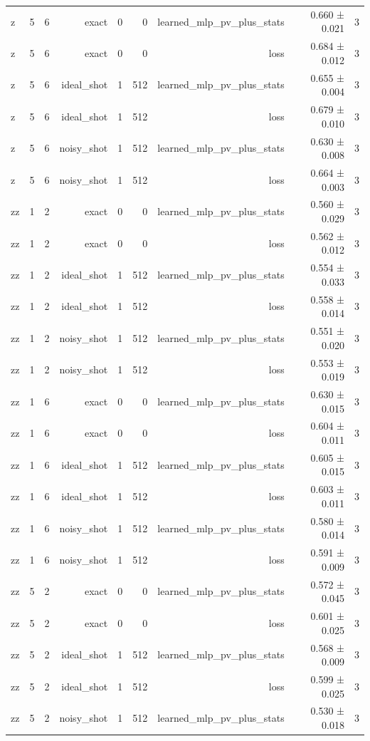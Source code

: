 \begin{table}
\begin{tabular}{lrrrrrrrr}
z & 5 & 6 & exact & 0 & 0 & learned\_mlp\_pv\_plus\_stats & 0.660 ± 0.021 & 3 \\
z & 5 & 6 & exact & 0 & 0 & loss & 0.684 ± 0.012 & 3 \\
z & 5 & 6 & ideal\_shot & 1 & 512 & learned\_mlp\_pv\_plus\_stats & 0.655 ± 0.004 & 3 \\
z & 5 & 6 & ideal\_shot & 1 & 512 & loss & 0.679 ± 0.010 & 3 \\
z & 5 & 6 & noisy\_shot & 1 & 512 & learned\_mlp\_pv\_plus\_stats & 0.630 ± 0.008 & 3 \\
z & 5 & 6 & noisy\_shot & 1 & 512 & loss & 0.664 ± 0.003 & 3 \\
zz & 1 & 2 & exact & 0 & 0 & learned\_mlp\_pv\_plus\_stats & 0.560 ± 0.029 & 3 \\
zz & 1 & 2 & exact & 0 & 0 & loss & 0.562 ± 0.012 & 3 \\
zz & 1 & 2 & ideal\_shot & 1 & 512 & learned\_mlp\_pv\_plus\_stats & 0.554 ± 0.033 & 3 \\
zz & 1 & 2 & ideal\_shot & 1 & 512 & loss & 0.558 ± 0.014 & 3 \\
zz & 1 & 2 & noisy\_shot & 1 & 512 & learned\_mlp\_pv\_plus\_stats & 0.551 ± 0.020 & 3 \\
zz & 1 & 2 & noisy\_shot & 1 & 512 & loss & 0.553 ± 0.019 & 3 \\
zz & 1 & 6 & exact & 0 & 0 & learned\_mlp\_pv\_plus\_stats & 0.630 ± 0.015 & 3 \\
zz & 1 & 6 & exact & 0 & 0 & loss & 0.604 ± 0.011 & 3 \\
zz & 1 & 6 & ideal\_shot & 1 & 512 & learned\_mlp\_pv\_plus\_stats & 0.605 ± 0.015 & 3 \\
zz & 1 & 6 & ideal\_shot & 1 & 512 & loss & 0.603 ± 0.011 & 3 \\
zz & 1 & 6 & noisy\_shot & 1 & 512 & learned\_mlp\_pv\_plus\_stats & 0.580 ± 0.014 & 3 \\
zz & 1 & 6 & noisy\_shot & 1 & 512 & loss & 0.591 ± 0.009 & 3 \\
zz & 5 & 2 & exact & 0 & 0 & learned\_mlp\_pv\_plus\_stats & 0.572 ± 0.045 & 3 \\
zz & 5 & 2 & exact & 0 & 0 & loss & 0.601 ± 0.025 & 3 \\
zz & 5 & 2 & ideal\_shot & 1 & 512 & learned\_mlp\_pv\_plus\_stats & 0.568 ± 0.009 & 3 \\
zz & 5 & 2 & ideal\_shot & 1 & 512 & loss & 0.599 ± 0.025 & 3 \\
zz & 5 & 2 & noisy\_shot & 1 & 512 & learned\_mlp\_pv\_plus\_stats & 0.530 ± 0.018 & 3 \\

\end{tabular}
\end{table}

